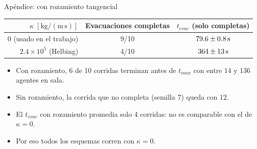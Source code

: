 \begin{frame}{Apéndice: con rozamiento tangencial}
  \footnotesize
  \begin{center}
    \begin{tabular}{rcc}
      \toprule
      $\kappa\;[\mathrm{kg/(m\,s)}]$ & Evacuaciones completas & $t_{evac}$ (solo completas) \\ \midrule
      $0$ (usado en el trabajo)  & 9/10 & $79.6 \pm 0.8\,\mathrm{s}$ \\
      $2.4\times10^{5}$ (Helbing) & 4/10 & $364 \pm 13\,\mathrm{s}$ \\
      \bottomrule
    \end{tabular}
  \end{center}
  \begin{itemize}
    \item Con rozamiento, 6 de 10 corridas terminan antes de $t_{max}$ con entre $14$ y $136$ agentes en sala.
    \item Sin rozamiento, la corrida que no completa (semilla 7) queda con $12$.
    \item El $t_{evac}$ con rozamiento promedia solo 4 corridas: no es comparable con el de $\kappa = 0$.
    \item Por eso todos los esquemas corren con $\kappa = 0$.
  \end{itemize}
\end{frame}

